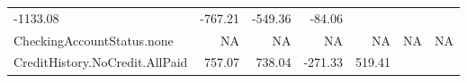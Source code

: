 \documentclass[]{article}
\begin{document}
\begin{longtable}[]{@{}lrrrrrr@{}}
\begin{minipage}[t]{0.08\columnwidth}
-1133.08\strut
\end{minipage} & \begin{minipage}[t]{0.08\columnwidth}\raggedleft\strut
-767.21\strut
\end{minipage} & \begin{minipage}[t]{0.08\columnwidth}\raggedleft\strut
-549.36\strut
\end{minipage} & \begin{minipage}[t]{0.08\columnwidth}\raggedleft\strut
-84.06\strut
\end{minipage}\tabularnewline
\begin{minipage}[t]{0.31\columnwidth}\raggedright\strut
CheckingAccountStatus.none\strut
\end{minipage} & \begin{minipage}[t]{0.10\columnwidth}\raggedleft\strut
NA\strut
\end{minipage} & \begin{minipage}[t]{0.08\columnwidth}\raggedleft\strut
NA\strut
\end{minipage} & \begin{minipage}[t]{0.08\columnwidth}\raggedleft\strut
NA\strut
\end{minipage} & \begin{minipage}[t]{0.08\columnwidth}\raggedleft\strut
NA\strut
\end{minipage} & \begin{minipage}[t]{0.08\columnwidth}\raggedleft\strut
NA\strut
\end{minipage} & \begin{minipage}[t]{0.08\columnwidth}\raggedleft\strut
NA\strut
\end{minipage}\tabularnewline
\begin{minipage}[t]{0.31\columnwidth}\raggedright\strut
CreditHistory.NoCredit.AllPaid\strut
\end{minipage} & \begin{minipage}[t]{0.10\columnwidth}\raggedleft\strut
757.07\strut
\end{minipage} & \begin{minipage}[t]{0.08\columnwidth}\raggedleft\strut
738.04\strut
\end{minipage} & \begin{minipage}[t]{0.08\columnwidth}\raggedleft\strut
-271.33\strut
\end{minipage} & \begin{minipage}[t]{0.08\columnwidth}\raggedleft\strut
519.41\strut
\end{minipage} & \begin{minipage}[t]{0.08\columnwidth}\raggedleft\strut

\end{minipage}
\end{longtable}
\end{document}
